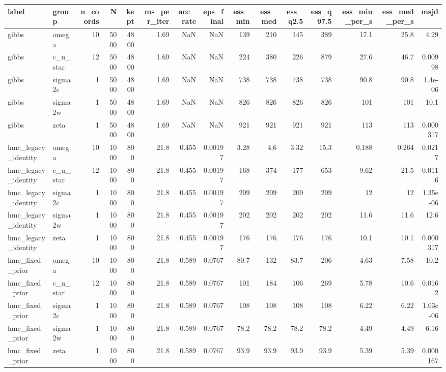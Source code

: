 \begin{tabular}{llrrrrrrrrrrrrr}
\toprule
label & group & n_coords & N & kept & ms_per_iter & acc_rate & eps_final & ess_min & ess_med & ess_q2.5 & ess_q97.5 & ess_min_per_s & ess_med_per_s & msjd \\
\midrule
gibbs & omega & 10 & 5000 & 4800 & 1.69 & NaN & NaN & 139 & 210 & 145 & 389 & 17.1 & 25.8 & 4.29 \\
gibbs & c_u_star & 12 & 5000 & 4800 & 1.69 & NaN & NaN & 224 & 380 & 226 & 879 & 27.6 & 46.7 & 0.00998 \\
gibbs & sigma2c & 1 & 5000 & 4800 & 1.69 & NaN & NaN & 738 & 738 & 738 & 738 & 90.8 & 90.8 & 1.4e-06 \\
gibbs & sigma2w & 1 & 5000 & 4800 & 1.69 & NaN & NaN & 826 & 826 & 826 & 826 & 101 & 101 & 10.1 \\
gibbs & zeta & 1 & 5000 & 4800 & 1.69 & NaN & NaN & 921 & 921 & 921 & 921 & 113 & 113 & 0.000317 \\
hmc_legacy_identity & omega & 10 & 1000 & 800 & 21.8 & 0.455 & 0.00197 & 3.28 & 4.6 & 3.32 & 15.3 & 0.188 & 0.264 & 0.0217 \\
hmc_legacy_identity & c_u_star & 12 & 1000 & 800 & 21.8 & 0.455 & 0.00197 & 168 & 374 & 177 & 653 & 9.62 & 21.5 & 0.0116 \\
hmc_legacy_identity & sigma2c & 1 & 1000 & 800 & 21.8 & 0.455 & 0.00197 & 209 & 209 & 209 & 209 & 12 & 12 & 1.35e-06 \\
hmc_legacy_identity & sigma2w & 1 & 1000 & 800 & 21.8 & 0.455 & 0.00197 & 202 & 202 & 202 & 202 & 11.6 & 11.6 & 12.6 \\
hmc_legacy_identity & zeta & 1 & 1000 & 800 & 21.8 & 0.455 & 0.00197 & 176 & 176 & 176 & 176 & 10.1 & 10.1 & 0.000317 \\
hmc_fixed_prior & omega & 10 & 1000 & 800 & 21.8 & 0.589 & 0.0767 & 80.7 & 132 & 83.7 & 206 & 4.63 & 7.58 & 10.2 \\
hmc_fixed_prior & c_u_star & 12 & 1000 & 800 & 21.8 & 0.589 & 0.0767 & 101 & 184 & 106 & 269 & 5.78 & 10.6 & 0.0162 \\
hmc_fixed_prior & sigma2c & 1 & 1000 & 800 & 21.8 & 0.589 & 0.0767 & 108 & 108 & 108 & 108 & 6.22 & 6.22 & 1.03e-06 \\
hmc_fixed_prior & sigma2w & 1 & 1000 & 800 & 21.8 & 0.589 & 0.0767 & 78.2 & 78.2 & 78.2 & 78.2 & 4.49 & 4.49 & 6.16 \\
hmc_fixed_prior & zeta & 1 & 1000 & 800 & 21.8 & 0.589 & 0.0767 & 93.9 & 93.9 & 93.9 & 93.9 & 5.39 & 5.39 & 0.000167 \\

\end{tabular}
